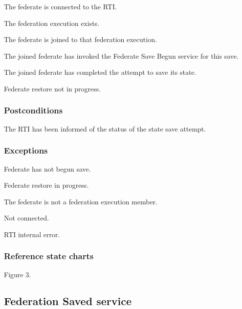 \begin{stdalphalist}
    \item The federate is connected to the RTI.
    \item The federation execution exists.
    \item The federate is joined to that federation execution.
    \item The joined federate has invoked the Federate Save Begun service for this save.
    \item The joined federate has completed the attempt to save its state.
    \item Federate restore not in progress.
\end{stdalphalist}

\subsubsection{Postconditions}

\begin{stdalphalist}
    \item The RTI has been informed of the status of the state save attempt.
\end{stdalphalist}

\subsubsection{Exceptions}

\begin{stdalphalist}
    \item Federate has not begun save.
    \item Federate restore in progress.
    \item The federate is not a federation execution member.
    \item Not connected.
    \item RTI internal error.
\end{stdalphalist}

\subsubsection{Reference state charts}

\begin{stdalphalist}
    \item Figure 3.
\end{stdalphalist}

\subsection{Federation Saved \rtiinitiated{} service}

